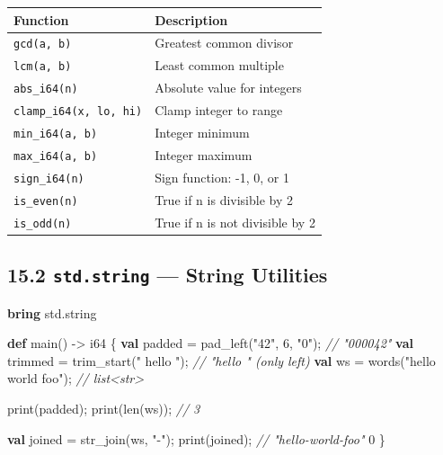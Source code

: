 \documentclass[
  english,
]{book}
\newenvironment{Shaded}{\begin{snugshade}}{\end{snugshade}}
\newcommand{\CommentTok}[1]{\textcolor[rgb]{0.42,0.60,0.33}{\textit{#1}}}
\newcommand{\DataTypeTok}[1]{\textcolor[rgb]{0.31,0.79,0.69}{#1}}
\newcommand{\DecValTok}[1]{\textcolor[rgb]{0.71,0.81,0.66}{#1}}
\newcommand{\FunctionTok}[1]{\textcolor[rgb]{0.86,0.86,0.67}{#1}}
\newcommand{\KeywordTok}[1]{\textcolor[rgb]{0.34,0.61,0.84}{\textbf{#1}}}
\newcommand{\NormalTok}[1]{\textcolor[rgb]{0.83,0.83,0.83}{#1}}
\newcommand{\OperatorTok}[1]{\textcolor[rgb]{0.83,0.83,0.83}{#1}}
\newcommand{\StringTok}[1]{\textcolor[rgb]{0.81,0.57,0.47}{#1}}
\begin{document}
\begin{longtable}[]{@{}ll@{}}
\toprule\noalign{}
Function & Description \\
\midrule\noalign{}
\endhead
\bottomrule\noalign{}
\endlastfoot
\texttt{gcd(a,\ b)} & Greatest common divisor \\
\texttt{lcm(a,\ b)} & Least common multiple \\
\texttt{abs\_i64(n)} & Absolute value for integers \\
\texttt{clamp\_i64(x,\ lo,\ hi)} & Clamp integer to range \\
\texttt{min\_i64(a,\ b)} & Integer minimum \\
\texttt{max\_i64(a,\ b)} & Integer maximum \\
\texttt{sign\_i64(n)} & Sign function: -1, 0, or 1 \\
\texttt{is\_even(n)} & True if n is divisible by 2 \\
\texttt{is\_odd(n)} & True if n is not divisible by 2 \\
\end{longtable}

\subsection{\texorpdfstring{15.2 \texttt{std.string} --- String
Utilities}{15.2 std.string --- String Utilities}}\label{std.string-string-utilities}

\begin{Shaded}
\begin{Highlighting}[]
\KeywordTok{bring}\NormalTok{ std}\OperatorTok{.}\NormalTok{string}

\KeywordTok{def}\NormalTok{ main() }\OperatorTok{{-}\textgreater{}} \DataTypeTok{i64}\NormalTok{ \{}
    \KeywordTok{val}\NormalTok{ padded }\OperatorTok{=}\NormalTok{ pad\_left(}\StringTok{"42"}\NormalTok{, }\DecValTok{6}\NormalTok{, }\StringTok{"0"}\NormalTok{);    }\CommentTok{// "000042"}
    \KeywordTok{val}\NormalTok{ trimmed }\OperatorTok{=}\NormalTok{ trim\_start(}\StringTok{"  hello  "}\NormalTok{);   }\CommentTok{// "hello  " (only left)}
    \KeywordTok{val}\NormalTok{ ws }\OperatorTok{=}\NormalTok{ words(}\StringTok{"hello world foo"}\NormalTok{);       }\CommentTok{// list\textless{}str\textgreater{}}

    \FunctionTok{print}\NormalTok{(padded);}
    \FunctionTok{print}\NormalTok{(}\FunctionTok{len}\NormalTok{(ws));   }\CommentTok{// 3}

    \KeywordTok{val}\NormalTok{ joined }\OperatorTok{=}\NormalTok{ str\_join(ws, }\StringTok{"{-}"}\NormalTok{);}
    \FunctionTok{print}\NormalTok{(joined);    }\CommentTok{// "hello{-}world{-}foo"}
    \DecValTok{0}
\NormalTok{\}}
\end{Highlighting}
\end{Shaded}
\end{document}

